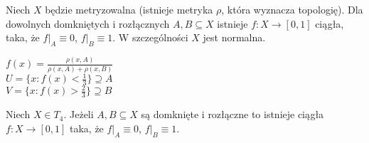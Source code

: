 \begin{tw} 
    Niech $X$ będzie metryzowalna (istnieje metryka $\rho$, która wyznacza topologię). Dla dowolnych domkniętych 
    i rozłącznych $A, B \subseteq X$ istnieje $ f: X \to [0,1]$ ciągła, taka, że $f |_A \equiv 0$, 
    $f |_B \equiv 1$. W szczególności $X$ jest normalna.
\end{tw} 
\begin{dd} 
    $f(x) = \frac{\rho(x,A)}{\rho(x,A)+\rho(x,B)}$ \\ 
    $U = \{ x : f(x) < \frac{1}{3} \} \supseteq A$ \\ 
    $V = \{ x: f(x) > \frac{2}{3} \} \supseteq B$
\end{dd}    
\begin{tw} 
    Niech $X \in T_4$. Jeżeli $A,B \subseteq X$ są domknięte i rozłączne to istnieje ciągła $f: X \to [0,1]$ 
    taka, że $f|_A \equiv 0$, $f|_B \equiv 1$.
\end{tw} 
